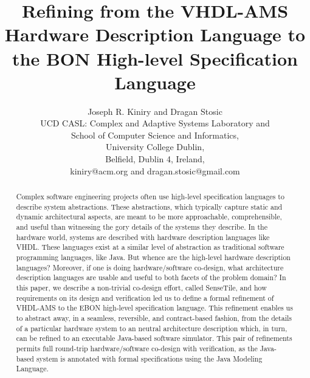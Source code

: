 \documentclass{article}
\begin{document}
\title{Refining from the VHDL-AMS Hardware Description Language 
to the BON High-level Specification Language}

\author{Joseph R. Kiniry and Dragan Stosic\\
UCD CASL: Complex and Adaptive Systems Laboratory and\\
School of Computer Science and Informatics,\\
University College Dublin,\\
Belfield, Dublin 4, Ireland,\\
kiniry@acm.org and dragan.stosic@gmail.com\\
}

\maketitle

\begin{abstract}

Complex software engineering projects often use high-level
specification languages to describe system abstractions.  These
abstractions, which typically capture static and dynamic architectural
aspects, are meant to be more approachable, comprehensible, and useful
than witnessing the gory details of the systems they describe.  In the
hardware world, systems are described with hardware description
languages like VHDL.  These languages exist at a similar level of
abstraction as traditional software programming languages, like Java.
But whence are the high-level hardware description languages?
Moreover, if one is doing hardware/software co-design, what
architecture description languages are usable and useful to both
facets of the problem domain?  In this paper, we describe a
non-trivial co-design effort, called SenseTile, and how requirements
on its design and verification led us to define a formal refinement of
VHDL-AMS to the EBON high-level specification language.  This
refinement enables us to abstract away, in a seamless, reversible, and
contract-based fashion, from the details of a particular hardware
system to an neutral architecture description which, in turn, can be
refined to an executable Java-based software simulator.  This pair of
refinements permits full round-trip hardware/software co-design with
verification, as the Java-based system is annotated with formal
specifications using the Java Modeling Language.

\end{abstract}
\end{document}
